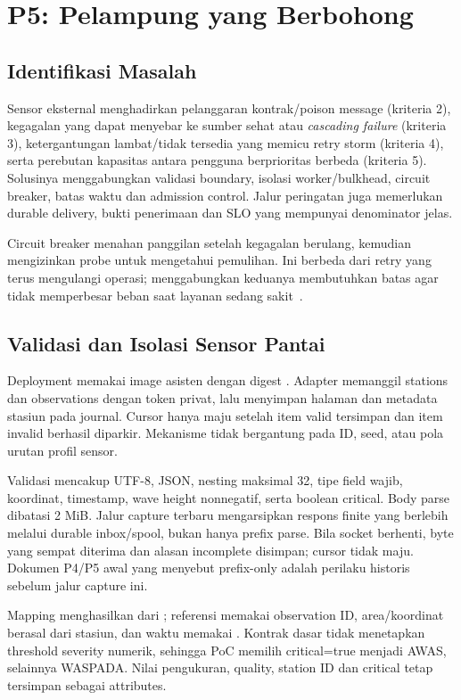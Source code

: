 \chapter{P5: Pelampung yang Berbohong}
\section{Identifikasi Masalah}
Sensor eksternal menghadirkan pelanggaran kontrak/poison message (kriteria 2), kegagalan yang dapat menyebar ke sumber sehat atau \emph{cascading failure} (kriteria 3), ketergantungan lambat/tidak tersedia yang memicu retry storm (kriteria 4), serta perebutan kapasitas antara pengguna berprioritas berbeda (kriteria 5). Solusinya menggabungkan validasi boundary, isolasi worker/bulkhead, circuit breaker, batas waktu dan admission control. Jalur peringatan juga memerlukan durable delivery, bukti penerimaan dan SLO yang mempunyai denominator jelas.

Circuit breaker menahan panggilan setelah kegagalan berulang, kemudian mengizinkan probe untuk mengetahui pemulihan. Ini berbeda dari retry yang terus mengulangi operasi; menggabungkan keduanya membutuhkan batas agar tidak memperbesar beban saat layanan sedang sakit~\cite{breaker}.

\section{Validasi dan Isolasi Sensor Pantai}
Deployment memakai image asisten dengan digest . Adapter memanggil stations dan observations dengan token privat, lalu menyimpan halaman dan metadata stasiun pada journal. Cursor hanya maju setelah item valid tersimpan dan item invalid berhasil diparkir. Mekanisme tidak bergantung pada ID, seed, atau pola urutan profil sensor.

Validasi mencakup UTF-8, JSON, nesting maksimal 32, tipe field wajib, koordinat, timestamp, wave height nonnegatif,  serta boolean critical. Body parse dibatasi 2 MiB. Jalur capture terbaru mengarsipkan respons finite yang berlebih melalui durable inbox/spool, bukan hanya prefix parse. Bila socket berhenti, byte yang sempat diterima dan alasan incomplete disimpan; cursor tidak maju. Dokumen P4/P5 awal yang menyebut prefix-only adalah perilaku historis sebelum jalur capture ini.

Mapping menghasilkan  dari ; referensi memakai observation ID, area/koordinat berasal dari stasiun, dan waktu memakai . Kontrak dasar tidak menetapkan threshold severity numerik, sehingga PoC memilih critical=true menjadi AWAS, selainnya WASPADA. Nilai pengukuran, quality, station ID dan critical tetap tersimpan sebagai attributes.

